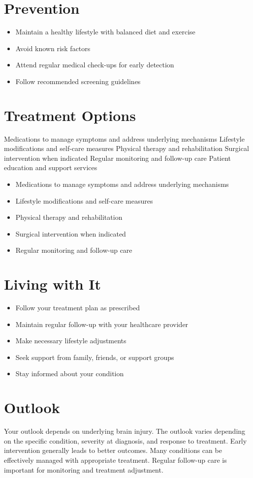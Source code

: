 \section{Prevention}
\begin{itemize}[noitemsep]
  \item Maintain a healthy lifestyle with balanced diet and exercise
  \item Avoid known risk factors
  \item Attend regular medical check-ups for early detection
  \item Follow recommended screening guidelines
\end{itemize}
\section{Treatment Options}
Medications to manage symptoms and address underlying mechanisms Lifestyle modifications and self-care measures Physical therapy and rehabilitation Surgical intervention when indicated Regular monitoring and follow-up care Patient education and support services

\begin{itemize}[noitemsep]
  \item Medications to manage symptoms and address underlying mechanisms
  \item Lifestyle modifications and self-care measures
  \item Physical therapy and rehabilitation
  \item Surgical intervention when indicated
  \item Regular monitoring and follow-up care
\end{itemize}
\section{Living with It}
\begin{itemize}[noitemsep]
  \item Follow your treatment plan as prescribed
  \item Maintain regular follow-up with your healthcare provider
  \item Make necessary lifestyle adjustments
  \item Seek support from family, friends, or support groups
  \item Stay informed about your condition
\end{itemize}
\section{Outlook}
Your outlook depends on underlying brain injury. The outlook varies depending on the specific condition, severity at diagnosis, and response to treatment. Early intervention generally leads to better outcomes. Many conditions can be effectively managed with appropriate treatment. Regular follow-up care is important for monitoring and treatment adjustment.
